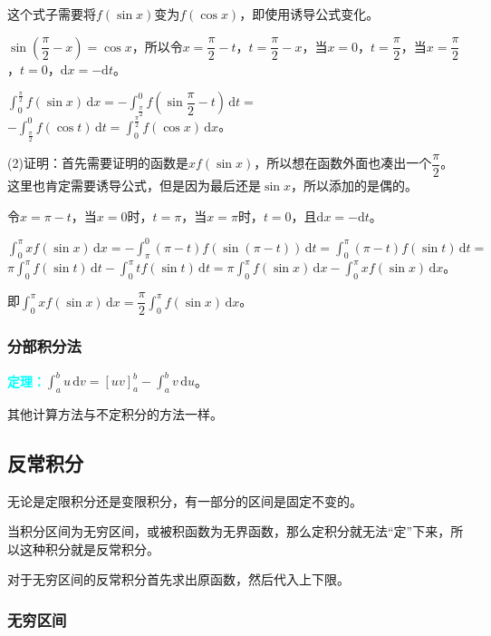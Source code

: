 \documentclass[UTF8, 12pt]{ctexart}
\begin{document}
这个式子需要将$f(\sin x)$变为$f(\cos x)$，即使用诱导公式变化。

$\sin\left(\dfrac{\pi}{2}-x\right)=\cos x$，所以令$x=\dfrac{\pi}{2}-t$，$t=\dfrac{\pi}{2}-x$，当$x=0$，$t=\dfrac{\pi}{2}$，当$x=\dfrac{\pi}{2}$，$t=0$，$\textrm{d}x=-\textrm{d}t$。

$\int_0^\frac{\pi}{2}f(\sin x)\,\textrm{d}x=-\displaystyle{\int_\frac{\pi}{2}^0f\left(\sin\dfrac{\pi}{2}-t\right)\,\textrm{d}t}=$$-\int_\frac{\pi}{2}^0f(\cos t)\,\textrm{d}t=\int^\frac{\pi}{2}_0f(\cos x)\,\textrm{d}x$。

(2)证明：首先需要证明的函数是$xf(\sin x)$，所以想在函数外面也凑出一个$\dfrac{\pi}{2}$。这里也肯定需要诱导公式，但是因为最后还是$\sin x$，所以添加的是偶的。

令$x=\pi-t$，当$x=0$时，$t=\pi$，当$x=\pi$时，$t=0$，且$\textrm{d}x=-\textrm{d}t$。

$\int_0^\pi xf(\sin x)\,\textrm{d}x=-\int_\pi^0(\pi-t)f(\sin(\pi-t))\,\textrm{d}t=\int_0^\pi(\pi-t)f(\sin t)\,\textrm{d}t=$\\$\pi\int_0^\pi f(\sin t)\,\textrm{d}t-\int_0^\pi tf(\sin t)\,\textrm{d}t=\pi\int_0^\pi f(\sin x)\,\textrm{d}x-\int_0^\pi xf(\sin x)\,\textrm{d}x$。

即$\int_0^\pi xf(\sin x)\,\textrm{d}x=\dfrac{\pi}{2}\int_0^\pi f(\sin x)\,\textrm{d}x$。

\subsubsection{分部积分法}

\textcolor{aqua}{\textbf{定理：}}$\int_a^bu\,\textrm{d}v=[uv]_a^b-\int_a^bv\,\textrm{d}u$。

其他计算方法与不定积分的方法一样。

\subsection{反常积分}

无论是定限积分还是变限积分，有一部分的区间是固定不变的。

当积分区间为无穷区间，或被积函数为无界函数，那么定积分就无法“定”下来，所以这种积分就是反常积分。

对于无穷区间的反常积分首先求出原函数，然后代入上下限。

\subsubsection{无穷区间}
\end{document}
